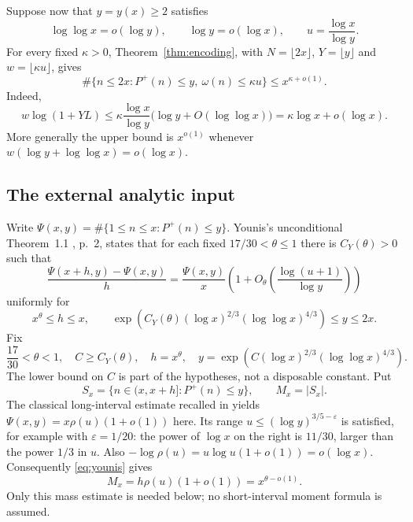 \documentclass[11pt]{amsart}
\theoremstyle{definition}
\theoremstyle{remark}
\newcommand{\eps}{\varepsilon}
\newcommand{\loglog}{\log\log}
\begin{document}
Suppose now that $y=y(x)\ge2$ satisfies
\begin{equation}\label{eq:yscale}
 \loglog x=o(\log y),\qquad \log y=o(\log x),
 \qquad u=\frac{\log x}{\log y}.
\end{equation}
For every fixed $\kappa>0$, Theorem~\ref{thm:encoding}, with
$N=\lfloor2x\rfloor$, $Y=\lfloor y\rfloor$ and
$w=\lfloor\kappa u\rfloor$, gives
\begin{equation}\label{eq:global-low}
 \#\{n\le2x:P^+(n)\le y,\ \omega(n)\le\kappa u\}
 \le x^{\kappa+o(1)}.
\end{equation}
Indeed,
\[
 w\log(1+YL)
 \le\kappa\frac{\log x}{\log y}
       \bigl(\log y+O(\loglog x)\bigr)
 =\kappa\log x+o(\log x).
\]
More generally the upper bound is $x^{o(1)}$ whenever
$w(\log y+\loglog x)=o(\log x)$.

\subsection{The external analytic input}
Write $\Psi(x,y)=\#\{1\le n\le x:P^+(n)\le y\}$.
Younis's unconditional Theorem~1.1 \cite{Younis}, p.~2, states that for
each fixed $17/30<\theta\le1$ there is $C_Y(\theta)>0$ such that
\begin{equation}\label{eq:younis}
 \frac{\Psi(x+h,y)-\Psi(x,y)}h
 =\frac{\Psi(x,y)}x
  \left(1+O_\theta\left(\frac{\log(u+1)}{\log y}\right)\right)
\end{equation}
uniformly for
\[
 x^\theta\le h\le x,\qquad
 \exp\!\left(C_Y(\theta)(\log x)^{2/3}(\loglog x)^{4/3}\right)
 \le y\le2x.
\]
Fix
\begin{equation}\label{eq:parameters}
 \frac{17}{30}<\theta<1,\quad C\ge C_Y(\theta),\quad
 h=x^\theta,\quad
 y=\exp\!\left(C(\log x)^{2/3}(\loglog x)^{4/3}\right).
\end{equation}
The lower bound on $C$ is part of the hypotheses, not a disposable constant.
Put
\[
 S_x=\{n\in(x,x+h]:P^+(n)\le y\},\qquad M_x=|S_x|.
\]
The classical long-interval estimate recalled in
\cite[equations (1.8)--(1.9), p.~415]{HT} yields
$\Psi(x,y)=x\rho(u)(1+o(1))$ here. Its range
$u\le(\log y)^{3/5-\eps}$ is satisfied, for example with $\eps=1/20$:
the power of $\log x$ on the right is $11/30$, larger than the power
$1/3$ in $u$.
Also $-\log\rho(u)=u\log u(1+o(1))=o(\log x)$.
Consequently \eqref{eq:younis} gives
\begin{equation}\label{eq:mass}
 M_x=h\rho(u)(1+o(1))=x^{\theta-o(1)}.
\end{equation}
Only this mass estimate is needed below; no short-interval moment formula
is assumed.
\end{document}
